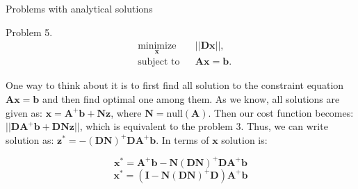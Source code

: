 \documentclass{beamer}
\begin{document}
\begin{frame}{Problems with analytical solutions}
\begin{flushleft}

Problem 5. 
%
\begin{equation}
\begin{aligned}
& \underset{\mathbf{x}}{\text{minimize}}
& & || \mathbf{D}\mathbf{x} ||, \\
& \text{subject to}
& & \mathbf{A} \mathbf{x} = \mathbf{b}.
\end{aligned}
\end{equation}

One way to think about it is to first find all solution to the constraint equation $\mathbf{A} \mathbf{x} = \mathbf{b}$ and then find optimal one among them. As we know, all solutions are given as: $\mathbf{x} = \mathbf{A}^+\mathbf{b} + \mathbf{N}\mathbf{z}$, where $\mathbf{N} = \text{null}(\mathbf{A})$. Then our cost function becomes: $|| \mathbf{D}\mathbf{A}^+\mathbf{b} +  \mathbf{D}\mathbf{N}\mathbf{z} ||$, which is equivalent to the problem 3. Thus, we can write solution as: 
$\mathbf{z}^* = -(\mathbf{D}\mathbf{N})^+ \mathbf{D}\mathbf{A}^+\mathbf{b}$. In terms of $\mathbf{x}$ solution is:

\begin{equation}
    \mathbf{x}^* = \mathbf{A}^+\mathbf{b}-\mathbf{N}(\mathbf{D}\mathbf{N})^+ \mathbf{D}\mathbf{A}^+\mathbf{b}
\end{equation}
\begin{equation}
	\mathbf{x}^* =( \mathbf{I}-\mathbf{N}(\mathbf{D}\mathbf{N})^+ \mathbf{D})\mathbf{A}^+\mathbf{b}
\end{equation}

\end{flushleft}
\end{frame}
\end{document}

